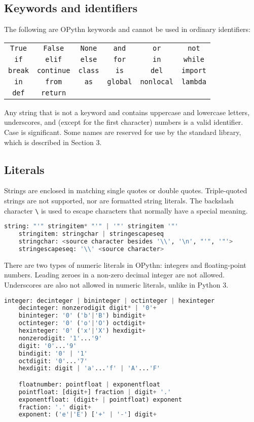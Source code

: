 \documentclass[11pt, twoside]{article}
\newcommand{\ms}{\texttt}
\begin{document}
    \subsection{Keywords and identifiers}
    The following are OPythn keywords and cannot be used in ordinary identifiers:
    \begin{center}
        \begin{tabular}{cccccc}
            \ms{True} & \ms{False} & \ms{None} & \ms{and} & \ms{or} & \ms{not}\\
            \ms{if} & \ms{elif} & \ms{else} & \ms{for} & \ms{in} & \ms{while}\\
            \ms{break} & \ms{continue} & \ms{class} & \ms{is} & \ms{del} & \ms{import}\\
            \ms{in} & \ms{from} & \ms{as} &\ms{global} & \ms{nonlocal} & \ms{lambda}\\
            \ms{def} & \ms{return} &&&&
    \end{tabular}
    \end{center}
    Any string that is not a keyword and contains uppercase and lowercase letters, underscores, and (except for the first character) numbers is a valid identifier. Case is significant. Some names are reserved for use by the standard library, which is described in Section 3.
    \subsection{Literals}
    Strings are enclosed in matching single quotes or double quotes. Triple-quoted strings are not supported, nor are formatted string literals. The backslash character \ms{\textbackslash} is used to escape characters that normally have a special meaning.
    \begin{lstlisting}[language=python]
    string: "'" stringitem* "'" | '"' stringitem '"'
    stringitem: stringchar | stringescapeseq
    stringchar: <source character besides '\\', '\n', "'", '"'>
    stringescapeseq: '\\' <source character>
    \end{lstlisting}
    \indent There are two types of numeric literals in OPythn: integers and floating-point numbers. Leading zeroes in a non-zero decimal integer are not allowed. Underscores are also not allowed in numeric literals, unlike in Python 3.
    \begin{lstlisting}[language=python]
    integer: decinteger | bininteger | octinteger | hexinteger
    decinteger: nonzerodigit digit* | '0'+
    bininteger: '0' ('b'|'B') bindigit+
    octinteger: '0' ('o'|'O') octdigit+
    hexinteger: '0' ('x'|'X') hexdigit+
    nonzerodigit: '1'...'9'
    digit: '0'...'9'
    bindigit: '0' | '1'
    octdigit: '0'...'7'
    hexdigit: digit | 'a'...'f' | 'A'...'F'

    floatnumber: pointfloat | exponentfloat
    pointfloat: [digit+] fraction | digit+ '.'
    exponentfloat: (digit+ | pointfloat) exponent
    fraction: '.' digit+
    exponent: ('e'|'E') ['+' | '-'] digit+
    \end{lstlisting}
\end{document}
